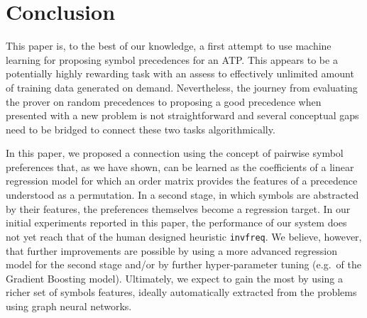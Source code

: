 \section{Conclusion}

This paper is, to the best of our knowledge, a first attempt to use machine learning for proposing symbol precedences for an ATP. 
This appears to be a potentially highly rewarding task with an assess to effectively unlimited amount of training data generated on demand.
Nevertheless, the journey from evaluating the prover on random precedences to proposing a good precedence when presented 
with a new problem is not straightforward and several conceptual gaps need to be bridged to connect these two tasks algorithmically. 

In this paper, we proposed a connection using the concept of pairwise symbol preferences that, as we have shown,
can be learned as the coefficients of a linear regression model for 
which an order matrix provides the features of a precedence understood as a permutation. 
In a second stage, in which symbols are abstracted by their features, the preferences themselves become a regression target.
In our initial experiments reported in this paper, the performance of our system does not
yet reach that of the human designed heuristic \texttt{invfreq}. We believe, however,
that further improvements are possible by using a more advanced regression model for the second stage
and/or by further hyper-parameter tuning (e.g.~of the Gradient Boosting model).
Ultimately, we expect to gain the most by using a richer set of symbols features,
ideally automatically extracted from the problems using graph neural networks. 





